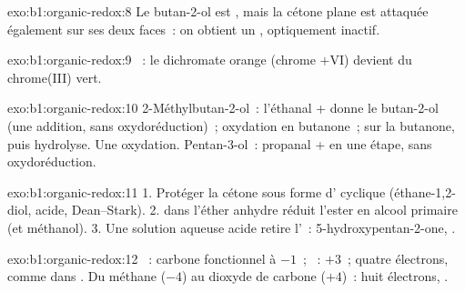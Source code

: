\begin{solution}{exo:b1:organic-redox:8}
Le butan-2-ol est , mais la cétone plane est attaquée également
sur ses deux faces~: on obtient un , optiquement
inactif.
\end{solution}

\begin{solution}{exo:b1:organic-redox:9}
~: le
dichromate orange (chrome $+$VI) devient du chrome(III) vert.
\end{solution}

\begin{solution}{exo:b1:organic-redox:10}
2-Méthylbutan-2-ol~: l'éthanal +  donne le butan-2-ol
(une addition, sans oxydoréduction)~; oxydation en butanone~;
 sur la butanone, puis hydrolyse. Une oxydation.
Pentan-3-ol~: propanal +  en une étape, sans
oxydoréduction.
\end{solution}

\begin{solution}{exo:b1:organic-redox:11}
1. Protéger la cétone sous forme d' cyclique (éthane-1,2-diol,
acide, Dean--Stark). 2.  dans l'éther anhydre réduit l'ester
en alcool primaire (et méthanol). 3. Une solution aqueuse acide retire
l'~: 5-hydroxypentan-2-one, .
\end{solution}

\begin{solution}{exo:b1:organic-redox:12}
~: carbone fonctionnel à $-1$~; ~: $+3$~; quatre
électrons, comme dans
. Du méthane ($-4$) au dioxyde de
carbone ($+4$)~: huit électrons, .
\end{solution}

